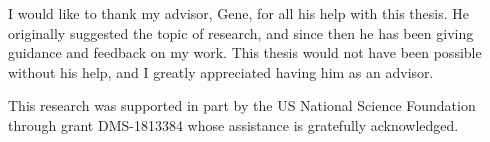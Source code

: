 
I would like to thank my advisor, Gene, for all his help with this thesis. He originally suggested the topic of research, and since then he has been giving guidance and feedback on my work. This thesis would not have been possible without his help, and I greatly appreciated having him as an advisor.

This research was supported in part by the US National Science Foundation through grant DMS-1813384 whose assistance is gratefully acknowledged.



